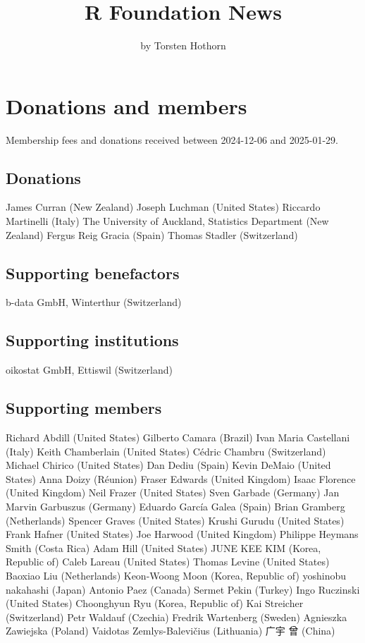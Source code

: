 \title{R Foundation News}
\author{by Torsten Hothorn}
\maketitle
\section{Donations and members}\label{donations-and-members}
Membership fees and donations received between
2024-12-06 and 2025-01-29.
\subsection{Donations}\label{donations}
James Curran (New Zealand)
Joseph Luchman (United States)
Riccardo Martinelli (Italy)
The University of Auckland, Statistics Department (New Zealand)
Fergus Reig Gracia (Spain)
Thomas Stadler (Switzerland)
\subsection{Supporting benefactors}\label{supporting-benefactors}
b-data GmbH, Winterthur (Switzerland)
\subsection{Supporting institutions}\label{supporting-institutions}
oikostat GmbH, Ettiswil (Switzerland)
\subsection{Supporting members}\label{supporting-members}
Richard Abdill (United States)
Gilberto Camara (Brazil)
Ivan Maria Castellani (Italy)
Keith Chamberlain (United States)
Cédric Chambru (Switzerland)
Michael Chirico (United States)
Dan Dediu (Spain)
Kevin DeMaio (United States)
Anna Doizy (Réunion)
Fraser Edwards (United Kingdom)
Isaac Florence (United Kingdom)
Neil Frazer (United States)
Sven Garbade (Germany)
Jan Marvin Garbuszus (Germany)
Eduardo García Galea (Spain)
Brian Gramberg (Netherlands)
Spencer Graves (United States)
Krushi Gurudu (United States)
Frank Hafner (United States)
Joe Harwood (United Kingdom)
Philippe Heymans Smith (Costa Rica)
Adam Hill (United States)
JUNE KEE KIM (Korea, Republic of)
Caleb Lareau (United States)
Thomas Levine (United States)
Baoxiao Liu (Netherlands)
Keon-Woong Moon (Korea, Republic of)
yoshinobu nakahashi (Japan)
Antonio Paez (Canada)
Sermet Pekin (Turkey)
Ingo Ruczinski (United States)
Choonghyun Ryu (Korea, Republic of)
Kai Streicher (Switzerland)
Petr Waldauf (Czechia)
Fredrik Wartenberg (Sweden)
Agnieszka Zawiejska (Poland)
Vaidotas Zemlys-Balevičius (Lithuania)
广宇 曾 (China)
\address{%
Torsten Hothorn\\
Universität Zürich\\%
Switzerland\\
%
%
\textit{ORCiD: \href{https://orcid.org/0000-0001-8301-0471}{0000-0001-8301-0471}}\\%
\href{mailto:Torsten.Hothorn@R-project.org}{\nolinkurl{Torsten.Hothorn@R-project.org}}%
}
